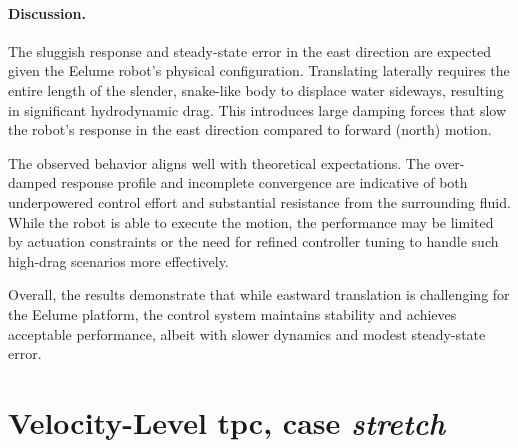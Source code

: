 \paragraph{Discussion.}

The sluggish response and steady-state error in the east direction are 
expected given the Eelume robot's physical configuration. Translating 
laterally requires the entire length of the slender, snake-like body to 
displace water sideways, resulting in significant hydrodynamic drag. This 
introduces large damping forces that slow the robot's response in the east 
direction compared to forward (north) motion.

The observed behavior aligns well with theoretical expectations. The over-
damped response profile and incomplete convergence are indicative of both 
underpowered control effort and substantial resistance from the surrounding 
fluid. While the robot is able to execute the motion, the performance may be 
limited by actuation constraints or the need for refined controller tuning to 
handle such high-drag scenarios more effectively.

Overall, the results demonstrate that while eastward translation is 
challenging for the Eelume platform, the control system maintains stability 
and achieves acceptable performance, albeit with slower dynamics and modest 
steady-state error.

\FloatBarrier

\newpage
\section{Velocity-Level \gls{tpc}, case \textit{stretch}}
\label{sec:res:stretch}

